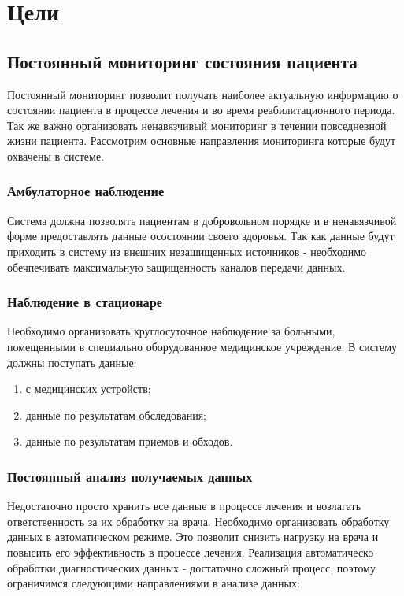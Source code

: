 \newpage
\chapter{Цели}
\section{Постоянный мониторинг состояния пациента	}

Постоянный мониторинг позволит получать наиболее актуальную информацию о
состоянии пациента в процессе лечения и во время реабилитационного периода. Так
же важно организовать ненавязчивый мониторинг в течении повседневной жизни
пациента. Рассмотрим основные направления мониторинга которые будут охвачены в
системе.

\subsection{Амбулаторное наблюдение}

Система должна позволять пациентам в добровольном порядке и в ненавязчивой форме
предоставлять данные осостоянии своего здоровья. Так как данные будут приходить
в систему из внешних незашищенных источников - необходимо обечпечивать
максимальную защищенность каналов передачи данных.

\subsection{Наблюдение в стационаре}

Необходимо организовать круглосуточное наблюдение за больными, помещенными в
специально оборудованное медицинское учреждение. В систему должны поступать
данные:

\begin{enumerate}
	\item с медицинских устройств;
	\item данные по результатам обследования;
	\item данные по результатам приемов и обходов.
\end{enumerate}

\subsection{Постоянный анализ получаемых данных}

Недостаточно просто хранить все данные в процессе лечения и возлагать
ответственность за их обработку на врача. Необходимо организовать обработку
данных в автоматическом режиме. Это позволит снизить нагрузку на врача и
повысить его эффективность в процессе лечения.
Реализация автоматическо обработки диагностических данных - достаточно сложный
процесс, поэтому ограничимся следующими направлениями в анализе данных:


